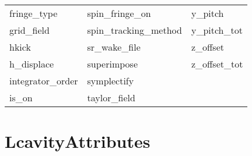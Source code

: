 \begin{tabular}{lll}
fringe_type                 & spin_fringe_on              & y_pitch                     \\
grid_field                  & spin_tracking_method        & y_pitch_tot                 \\
hkick                       & sr_wake_file                & z_offset                    \\
h_displace                  & superimpose                 & z_offset_tot                \\
integrator_order            & symplectify                 &                             \\
is_on                       & taylor_field                &                             \\
 \bottomrule
 \end{tabular}
 \vfill
 
 \section{LcavityAttributes}
 \label{s:list.lcavity}
 

